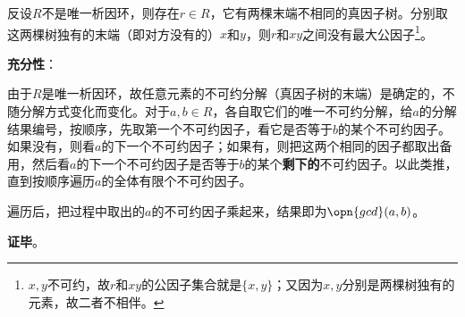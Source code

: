 反设$R$不是唯一析因环，则存在$r\in R$，它有两棵末端不相同的真因子树。分别取这两棵树独有的末端（即对方没有的）$x$和$y$，则$r$和$xy$之间没有最大公因子\footnote{$x, y$不可约，故$r$和$xy$的公因子集合就是$\{x, y\}$；又因为$x, y$分别是两棵树独有的元素，故二者不相伴。}。

\textbf{充分性}：

由于$R$是唯一析因环，故任意元素的不可约分解（真因子树的末端）是确定的，不随分解方式变化而变化。对于$a, b\in R$，各自取它们的唯一不可约分解，给$a$的分解结果编号，按顺序，先取第一个不可约因子，看它是否等于$b$的某个不可约因子。如果没有，则看$a$的下一个不可约因子；如果有，则把这两个相同的因子都取出备用，然后看$a$的下一个不可约因子是否等于$b$的某个\textbf{剩下的}不可约因子。以此类推，直到按顺序遍历$a$的全体有限个不可约因子。

遍历后，把过程中取出的$a$的不可约因子乘起来，结果即为$\opn{gcd}(a, b)$。

\textbf{证毕}。








































